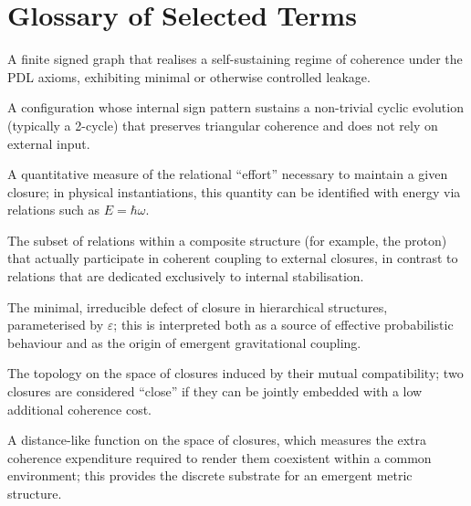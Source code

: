 \documentclass{article}
\begin{document}
\section{Glossary of Selected Terms}
\label{app:glossary}

\begin{description}[style=nextline,leftmargin=1.5cm]
  \item[Closure] A finite signed graph that realises a self-sustaining regime of
  coherence under the PDL axioms, exhibiting minimal or otherwise controlled
  leakage.

  \item[Logical stationary regime] A configuration whose internal sign
  pattern sustains a non-trivial cyclic evolution (typically a 2-cycle)
  that preserves triangular coherence and does not rely on external input.

  \item[Coherence cost] A quantitative measure of the relational “effort”
  necessary to maintain a given closure; in physical instantiations, this
  quantity can be identified with energy via relations such as \(E = \hbar \omega\).

  \item[Active surface] The subset of relations within a composite structure
  (for example, the proton) that actually participate in coherent coupling to
  external closures, in contrast to relations that are dedicated exclusively
  to internal stabilisation.

  \item[Leakage] The minimal, irreducible defect of closure in hierarchical
  structures, parameterised by \(\varepsilon\); this is interpreted both as
  a source of effective probabilistic behaviour and as the origin of emergent
  gravitational coupling.

  \item[Coexistence topology] The topology on the space of closures induced by
  their mutual compatibility; two closures are considered “close” if they can
  be jointly embedded with a low additional coherence cost.

  \item[Coherence-cost pseudo-metric] A distance-like function on the space of
  closures, which measures the extra coherence expenditure required to render
  them coexistent within a common environment; this provides the discrete
  substrate for an emergent metric structure.

\end{description}
\end{document}
